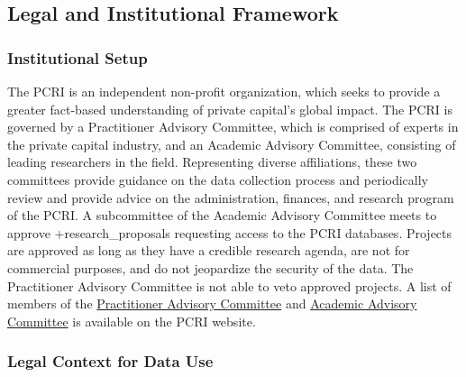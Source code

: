 \documentclass[
]{WileySix}
\begin{document}
\hypertarget{legal-and-institutional-framework-3}{%
\subsection{Legal and Institutional Framework}\label{legal-and-institutional-framework-3}}

\hypertarget{institutional-setup-3}{%
\subsubsection{Institutional Setup}\label{institutional-setup-3}}

The PCRI is an independent non-profit organization, which seeks to provide a greater fact-based understanding of private capital's global impact. The PCRI is governed by a Practitioner Advisory Committee, which is comprised of experts in the private capital industry, and an Academic Advisory Committee, consisting of leading researchers in the field. Representing diverse affiliations, these two committees provide guidance on the data collection process and periodically review and provide advice on the administration, finances, and research program of the PCRI. A subcommittee of the Academic Advisory Committee meets to approve +research\_proposals\textbar{} requesting access to the PCRI databases. Projects are approved as long as they have a credible research agenda, are not for commercial purposes, and do not jeopardize the security of the data. The Practitioner Advisory Committee is not able to veto approved projects. A list of members of the \href{http://privatecapitalresearchinstitute.org/advisory-committee.php}{Practitioner Advisory Committee} and \href{http://www.privatecapitalresearchinstitute.org/academic-advisory-board.php}{Academic Advisory Committee} is available on the PCRI website.

\hypertarget{legal-context-for-data-use-3}{%
\subsubsection{Legal Context for Data Use}\label{legal-context-for-data-use-3}}
\end{document}
